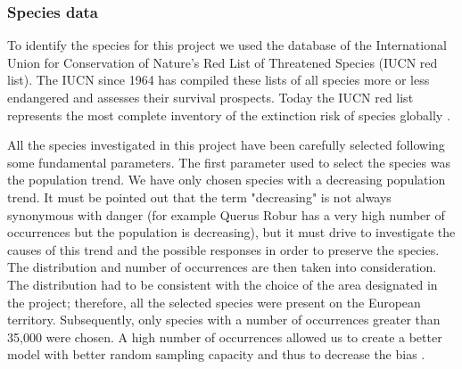 \documentclass[12pt,a4paper]{article}
\begin{document}
\subsubsection{Species data}
To identify the species for this project we used the database of the International Union for Conservation of Nature's Red List of Threatened Species (IUCN red list).
The IUCN since 1964 has compiled these lists of all species more or less endangered and assesses their survival prospects. Today the IUCN red list represents the most complete inventory of the extinction risk of species globally \citep {IUCN}.

All the species investigated in this project have been carefully selected following some fundamental parameters.
The first parameter used to select the species was the population trend. We have only chosen species with a decreasing population trend. It must be pointed out that the term "decreasing" is not always synonymous with danger (for example Querus Robur has a very high number of occurrences but the population is decreasing), but it must drive to investigate the causes of this trend and the possible responses in order to preserve the species.
The distribution and number of occurrences are then taken into consideration. The distribution had to be consistent with the choice of the area designated in the project; therefore, all the selected species were present on the European territory. Subsequently, only species with a number of occurrences greater than 35,000 were chosen. A high number of occurrences allowed us to create a better model with better random sampling capacity and thus to decrease the bias \citep {kaplan} .
\end{document}
